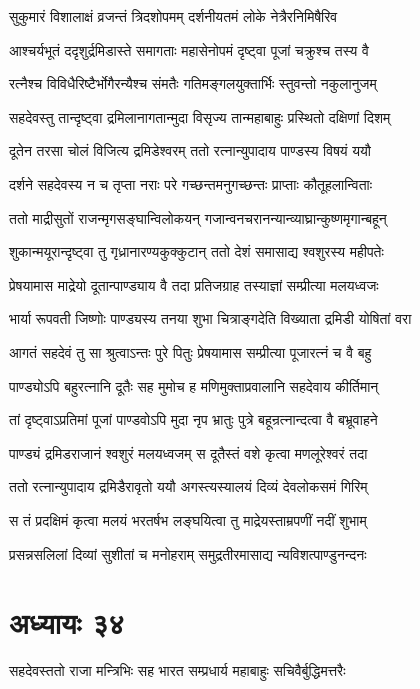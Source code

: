 \twolineshloka
{सुकुमारं विशालाक्षं व्रजन्तं त्रिदशोपमम्}
{दर्शनीयतमं लोके नेत्रैरनिमिषैरिव}


\twolineshloka
{आश्चर्यभूतं ददृशुर्द्रमिडास्ते समागताः}
{महासेनोपमं दृष्ट्वा पूजां चक्रुश्च तस्य वै}


\twolineshloka
{रत्नैश्च विविधैरिष्टैर्भोगैरन्यैश्च संमतैः}
{गतिमङ्गलयुक्तार्भिः स्तुवन्तो नकुलानुजम्}


\twolineshloka
{सहदेवस्तु तान्दृष्ट्वा द्रमिलानागतान्मुदा}
{विसृज्य तान्महाबाहुः प्रस्थितो दक्षिणां दिशम्}


\twolineshloka
{दूतेन तरसा चोलं विजित्य द्रमिडेश्वरम्}
{ततो रत्नान्युपादाय पाण्डस्य विषयं ययौ}


\twolineshloka
{दर्शने सहदेवस्य न च तृप्ता नराः परे}
{गच्छन्तमनुगच्छन्तः प्राप्ताः कौतूहलान्विताः}


\twolineshloka
{ततो माद्रीसुतों राजन्मृगसङ्घान्विलोकयन्}
{गजान्वनचरानन्यान्व्याघ्रान्कुष्णमृगान्बहून्}


\twolineshloka
{शुकान्मयूरान्दृष्ट्वा तु गृध्रानारण्यकुक्कुटान्}
{ततो देशं समासाद्य श्वशुरस्य महीपतेः}


\twolineshloka
{प्रेषयामास माद्रेयो दूतान्पाण्ड्याय वै तदा}
{प्रतिजग्राह तस्याज्ञां सम्प्रीत्या मलयध्वजः}


\twolineshloka
{भार्या रूपवती जिष्णोः पाण्ड्यस्य तनया शुभा}
{चित्राङ्गदेति विख्याता द्रमिडी योषितां वरा}


\twolineshloka
{आगतं सहदेवं तु सा श्रुत्वाऽन्तः पुरे पितुः}
{प्रेषयामास सम्प्रीत्या पूजारत्नं च वै बहु}


\twolineshloka
{पाण्ड्योऽपि बहुरत्नानि दूतैः सह मुमोच ह}
{मणिमुक्ताप्रवालानि सहदेवाय कीर्तिमान्}


\twolineshloka
{तां दृष्ट्वाऽप्रतिमां पूजां पाण्डवोऽपि मुदा नृप}
{भ्रातुः पुत्रे बहून्रत्नान्दत्वा वै बभ्रूवाहने}


\twolineshloka
{पाण्ड्यं द्रमिडराजानं श्वशुरं मलयध्वजम्}
{स दूतैस्तं वशे कृत्वा मणलूरेश्वरं तदा}


\twolineshloka
{ततो रत्नान्युपादाय द्रमिडैरावृतो ययौ}
{अगस्त्यस्यालयं दिव्यं देवलोकसमं गिरिम्}


\twolineshloka
{स तं प्रदक्षिमं कृत्वा मलयं भरतर्षभ}
{लङ्घयित्वा तु माद्रेयस्ताम्रपणीं नदीं शुभाम्}


\twolineshloka
{प्रसन्नसलिलां दिव्यां सुशीतां च मनोहराम्}
{समुद्रतीरमासाद्य न्यविशत्पाण्डुनन्दनः}


\chapter{अध्यायः ३४}
\twolineshloka
{सहदेवस्ततो राजा मन्त्रिभिः सह भारत}
{सम्प्रधार्य महाबाहुः सचिवैर्बुद्धिमत्तरैः}


